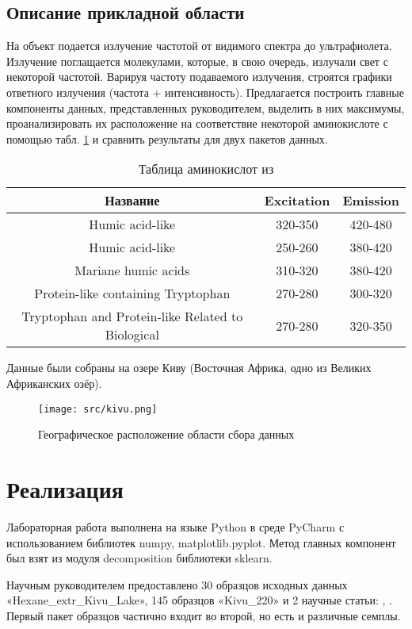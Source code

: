 \documentclass[a4paper]{article}
\begin{document}
\subsection{Описание прикладной области}
На объект подается излучение частотой от видимого спектра до ультрафиолета. Излучение поглащается молекулами, которые, в свою очередь, излучали свет с некоторой частотой. Варируя частоту подаваемого излучения, строятся графики ответного излучения (частота + интенсивность). Предлагается построить главные компоненты данных, представленных руководителем, выделить в них максимумы, проанализировать их расположение на соответствие некоторой аминокислоте с помощью табл. \ref{tab:amino} и сравнить результаты для двух пакетов данных.
\begin{table}[H]
    \centering
    \begin{tabular}{|c|c|c|}
        \hline
         Название&Excitation&Emission  \\
         \hline
         Humic acid-like&320-350&420-480\\
         \hline
         Humic acid-like&250-260&380-420\\
         \hline
         Mariane humic acids&310-320&380-420\\
         \hline
         Protein-like containing Tryptophan&270-280&300-320\\
         \hline
         Tryptophan and Protein-like Related to Biological&270-280&320-350\\
         \hline
    \end{tabular}
    \caption{Таблица аминокислот из \cite{article1}}
    \label{tab:amino}
\end{table}
Данные были собраны на озере Киву (Восточная Африка, одно из Великих Африканских озёр).
\begin{figure}[H]
    \centering
    \texttt{[image: src/kivu.png]}
    \caption{Географическое расположение области сбора данных}
    \label{fig:kivu}
\end{figure}
\section{Реализация}
Лабораторная работа выполнена на языке Python в среде PyCharm с использованием библиотек numpy, matplotlib.pyplot. Метод главных компонент был взят из модуля decomposition библиотеки sklearn.

Научным руководителем предоставлено 30 образцов исходных данных \\«Hexane_extr_Kivu_Lake», 145 образцов «Kivu_220» и 2 научные статьи: \cite{article1}, \cite{article2}. Первый пакет образцов частично входит во второй, но есть и различные семплы.
\end{document}
